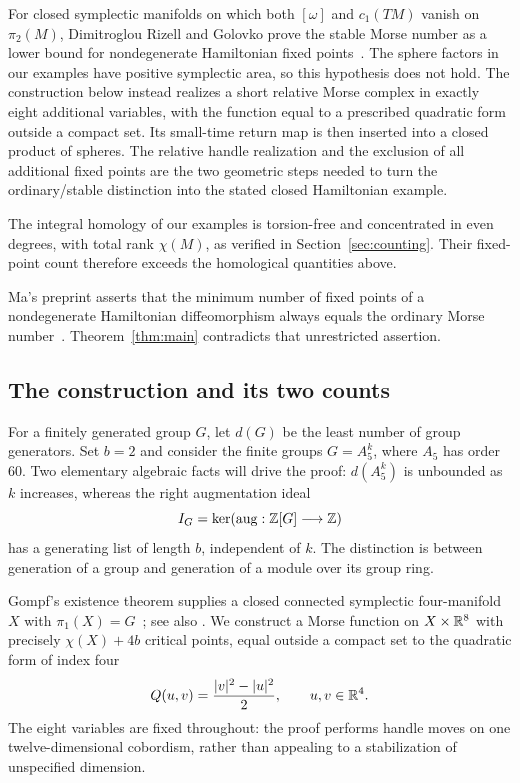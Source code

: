 For closed symplectic manifolds on which both $[\omega]$ and $c_1(TM)$
vanish on $\pi_2(M)$, Dimitroglou Rizell and Golovko prove the stable
Morse number as a lower bound for nondegenerate Hamiltonian fixed
points~\cite[Corollary~1.3]{DRG2017}.
The sphere factors in our examples have positive symplectic area, so
this hypothesis does not hold. The construction below instead realizes
a short relative Morse complex in exactly eight additional variables,
with the function equal to a prescribed quadratic form outside a compact
set. Its small-time return map is then inserted into a closed product
of spheres. The relative handle realization and the exclusion of all
additional fixed points are the two geometric steps needed to turn the
ordinary/stable distinction into the stated closed Hamiltonian example.

The integral homology of our examples is torsion-free and concentrated
in even degrees, with total rank $\chi(M)$, as verified in
Section~\ref{sec:counting}. Their fixed-point count therefore exceeds
the homological quantities above.

Ma's preprint asserts that the minimum number of fixed points of a
nondegenerate Hamiltonian diffeomorphism always equals the ordinary
Morse number~\cite[Theorem~1.5]{Ma2013}. Theorem~\ref{thm:main}
contradicts that unrestricted assertion.

\subsection{The construction and its two counts}
For a finitely generated group $G$, let $d(G)$ be the least number of group
generators. Set $b=2$ and consider the finite groups $G=A_5^k$, where
$A_5$ has order $60$. Two elementary algebraic facts will drive the proof:
$d(A_5^k)$ is unbounded as $k$ increases, whereas the right augmentation
ideal
\[
 I_G=\ker(\operatorname{aug}:\mathbb Z[G]\longrightarrow\mathbb Z)
\]
has a generating list of length $b$, independent of $k$.
The distinction is between generation of a group and generation of a
module over its group ring.

Gompf's existence theorem supplies a closed connected symplectic
four-manifold $X$ with $\pi_1(X)=G$~\cite[Theorem~3.1]{Gompf1992};
see also \cite{Gompf1995}.
We construct a Morse function on $X\times\mathbb R^8$ with precisely
$\chi(X)+4b$ critical points, equal outside a compact set to the quadratic
form of index four
\[
 Q(u,v)=\frac{|v|^2-|u|^2}{2},\qquad u,v\in\mathbb R^4.
\]
The eight variables are fixed throughout: the proof performs handle moves
on one twelve-dimensional cobordism, rather than appealing to a
stabilization of unspecified dimension.

